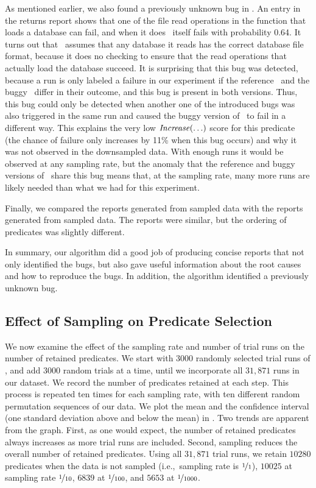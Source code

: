 As mentioned earlier,  we also found a  previously unknown bug in \moss.
An entry in the returns report shows that one of
the file read operations in the function that loads a database can
fail, and when it does \moss\ itself fails with probability 0.64.
It turns out that \moss\ assumes that any database it reads has the
correct database file format, because it does no checking to ensure
that the read operations that actually load the database succeed.  
It is surprising that this bug was detected,
because a run is only labeled a failure in our experiment if the
reference \moss\ and the buggy \moss\ differ in their outcome, and
this bug is present in both versions.  Thus, this bug could only be detected
when another one of the introduced bugs was also triggered in the same
run and caused the buggy version of \moss\ to fail in a different way.
This explains the very low $\mbox{\textit{Increase}}(\ldots)$ score for this
predicate (the chance of failure only increases by 11\% when this bug
occurs) and why it was not observed in the 
downsampled data.  With enough runs it would be observed at
any sampling rate, but the anomaly that the reference and buggy
versions of \moss\ share this bug means that, at the
 sampling rate, many more runs are likely needed
than what we had for this experiment.

Finally, we compared the reports generated from  sampled data
with the reports generated from  sampled data.  The reports were
similar, but the ordering of  predicates was slightly different.

In summary, our algorithm did a good job of producing concise reports that not
only identified the bugs, but also gave useful information about the root causes and
how to reproduce the bugs.  In addition, the algorithm identified a previously unknown
bug.

\subsection{Effect of Sampling on Predicate Selection}

We now examine the effect of the sampling rate and number of trial runs
on the number of retained predicates.
We start with $3000$ randomly
selected trial runs of \moss, and add $3000$ random trials at a time, until we
incorporate all $31,871$ runs in our dataset.  We record the number of
predicates retained at each step.  This process is repeated ten times
for each sampling rate, with ten different random permutation sequences
of our data. We plot the mean and the confidence interval (one
standard deviation above and below the mean) in
.  
Two trends are apparent from the graph.  First, as one would
expect, the number of retained predicates always increases as more trial runs 
are included.  Second, sampling reduces the overall number of retained 
predicates.
Using all $31,871$ trial runs, we retain $10280$ 
predicates when the data is not sampled (i.e.,\ sampling rate is 
$\nicefrac{1}{1}$), $10025$ at sampling
rate $\nicefrac{1}{10}$, $6839$ at $\nicefrac{1}{100}$, and $5653$ at
$\nicefrac{1}{1000}$.

